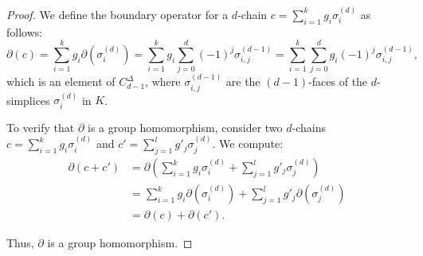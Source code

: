 \begin{proof}
    We define the boundary operator for a $d$-chain $c = \sum_{i=1}^{k} g_i \sigma_i^{(d)}$ as follows:
    \[
        \partial(c) = \sum_{i=1}^{k} g_i \partial(\sigma_i^{(d)}) = \sum_{i=1}^{k} g_i \sum_{j=0}^{d} (-1)^j \sigma_{i,j}^{(d-1)} = \sum_{i=1}^{k} \sum_{j=0}^{d} g_i (-1)^j \sigma_{i,j}^{(d-1)},
    \]
    which is an element of $C^{\Delta}_{d-1}$, where $\sigma_{i,j}^{(d-1)}$ are the $(d-1)$-faces of the $d$-simplices $\sigma_i^{(d)}$ in $K$.

    To verify that $\partial$ is a group homomorphism, consider two $d$-chains $c = \sum_{i=1}^{k} g_i \sigma_i^{(d)}$ and $c' = \sum_{j=1}^{l} g'_j \sigma_j^{(d)}$. We compute:
    \begin{align}
        \partial(c + c') &= \partial\left( \sum_{i=1}^{k} g_i \sigma_i^{(d)} + \sum_{j=1}^{l} g'_j \sigma_j^{(d)} \right) \\
                          &= \sum_{i=1}^{k} g_i \partial(\sigma_i^{(d)}) + \sum_{j=1}^{l} g'_j \partial(\sigma_j^{(d)}) \\
                          &= \partial(c) + \partial(c').
    \end{align}

    Thus, $\partial$ is a group homomorphism.
\end{proof}

